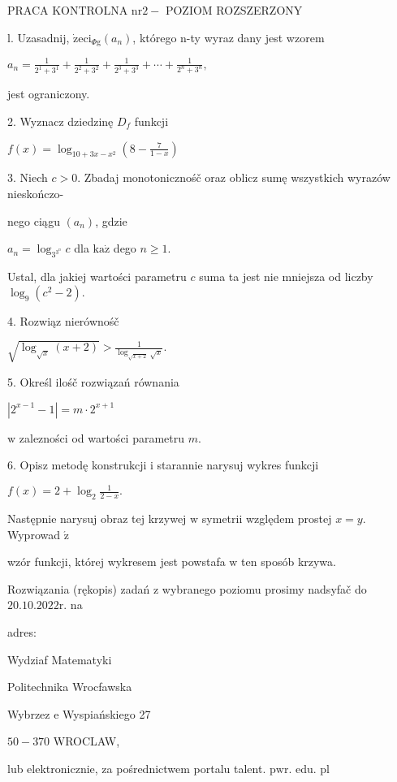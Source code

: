 \documentclass[a4paper,12pt]{article}
\begin{document}
PRACA KONTROLNA $\mathrm{n}\mathrm{r} 2-$ POZIOM ROZSZERZONY

l. Uzasadnij, $\dot{\mathrm{z}}\mathrm{e}\mathrm{c}\mathrm{i}_{\Phi \mathrm{g}}(a_{n})$, którego n-ty wyraz dany jest wzorem

$a_{n}=\displaystyle \frac{1}{2^{1}+3^{1}}+\frac{1}{2^{2}+3^{2}}+\frac{1}{2^{3}+3^{3}}+\cdots+\frac{1}{2^{n}+3^{n}},$

jest ograniczony.

2. Wyznacz dziedzinę $D_{f}$ funkcji

$f(x)=\displaystyle \log_{10+3x-x^{2}}(8-\frac{7}{1-x})$

3. Niech $c>0$. Zbadaj monotonicznośč oraz oblicz sumę wszystkich wyrazów nieskończo-

nego ciągu $(a_{n})$, gdzie

$a_{n}=\log_{3^{3^{n}}}c$ dla $\mathrm{k}\mathrm{a}\dot{\mathrm{z}}$ dego $n\geq 1.$

Ustal, dla jakiej wartości parametru $c$ suma ta jest nie mniejsza od liczby $\log_{9}(c^{2}-2).$

4. Rozwiąz nierównośč

$\displaystyle \sqrt{\log_{\sqrt{x}}(x+2)}>\frac{1}{\log_{\sqrt{x+2}}\sqrt{x}}.$

5. Określ ilośč rozwiązań równania

$|2^{x-1}-1|=m\cdot 2^{x+1}$

$\mathrm{w}$ zalezności od wartości parametru $m.$

6. Opisz metodę konstrukcji $\mathrm{i}$ starannie narysuj wykres funkcji

$f(x)=2+\displaystyle \log_{2}\frac{1}{2-x}.$

Następnie narysuj obraz tej krzywej $\mathrm{w}$ symetrii względem prostej $x =y.$ Wyprowad $\acute{\mathrm{z}}$

wzór funkcji, której wykresem jest powstafa $\mathrm{w}$ ten sposób krzywa.

Rozwiązania (rękopis) zadań $\mathrm{z}$ wybranego poziomu prosimy nadsyfač do $20.10.2022\mathrm{r}$. na

adres:

Wydziaf Matematyki

Politechnika Wrocfawska

Wybrzez $\mathrm{e}$ Wyspiańskiego 27

$50-370$ WROCLAW,

lub elektronicznie, za pośrednictwem portalu talent. $\mathrm{p}\mathrm{w}\mathrm{r}$. edu. pl
\end{document}
